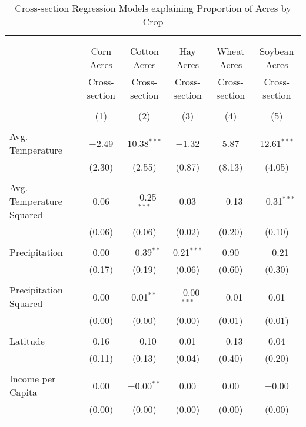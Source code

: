 \documentclass[10pt]{article}
\begin{document}
\newpage
\begin{table}[!htbp] \centering 
  \caption{Cross-section Regression Models explaining Proportion of Acres by Crop} 
  \label{} 
\footnotesize 
\begin{tabular}{@{\extracolsep{5pt}}lccccc} 
\\[-1.8ex]\hline 
\hline \\[-1.8ex] 
\\[-1.8ex] & Corn Acres & Cotton Acres & Hay Acres & Wheat Acres & Soybean Acres \\ 
 & Cross-section & Cross-section & Cross-section & Cross-section & Cross-section \\ 
\\[-1.8ex] & (1) & (2) & (3) & (4) & (5)\\ 
\hline \\[-1.8ex] 
 Avg. Temperature & $-$2.49 & 10.38$^{***}$ & $-$1.32 & 5.87 & 12.61$^{***}$ \\ 
  & (2.30) & (2.55) & (0.87) & (8.13) & (4.05) \\ 
  & & & & & \\ 
 Avg. Temperature Squared & 0.06 & $-$0.25$^{***}$ & 0.03 & $-$0.13 & $-$0.31$^{***}$ \\ 
  & (0.06) & (0.06) & (0.02) & (0.20) & (0.10) \\ 
  & & & & & \\ 
 Precipitation & 0.00 & $-$0.39$^{**}$ & 0.21$^{***}$ & 0.90 & $-$0.21 \\ 
  & (0.17) & (0.19) & (0.06) & (0.60) & (0.30) \\ 
  & & & & & \\ 
 Precipitation Squared & 0.00 & 0.01$^{**}$ & $-$0.00$^{***}$ & $-$0.01 & 0.01 \\ 
  & (0.00) & (0.00) & (0.00) & (0.01) & (0.01) \\ 
  & & & & & \\ 
 Latitude & 0.16 & $-$0.10 & 0.01 & $-$0.13 & 0.04 \\ 
  & (0.11) & (0.13) & (0.04) & (0.40) & (0.20) \\ 
  & & & & & \\ 
 Income per Capita & 0.00 & $-$0.00$^{**}$ & 0.00 & 0.00 & $-$0.00 \\ 
  & (0.00) & (0.00) & (0.00) & (0.00) & (0.00) \\ 
  & & & & & \\ 

\end{tabular}
\end{table}
\end{document}
